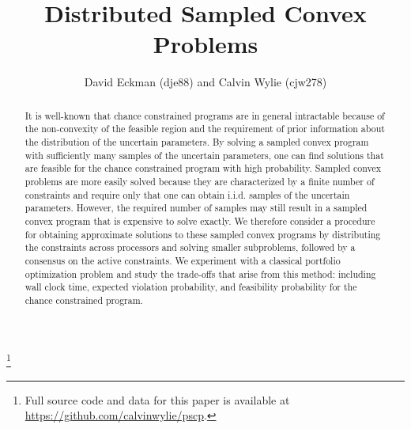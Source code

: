 \documentclass[12pt]{article}
\title{Distributed Sampled Convex Problems}
\author{David Eckman (dje88) and Calvin Wylie (cjw278)}
\date{}
\newcommand\blfootnote[1]{%
  \begingroup
  \renewcommand\thefootnote{}\footnote{#1}%
  \addtocounter{footnote}{-1}%
  \endgroup
}
\begin{document}
\setlength{\parindent}{24pt}

\maketitle

\begin{abstract}
It is well-known that chance constrained programs are in general intractable because of the non-convexity of the feasible region and the requirement of prior information about the distribution of the uncertain parameters.
By solving a sampled convex program with sufficiently many samples of the uncertain parameters, one can find solutions that are feasible for the chance constrained program with high probability.
Sampled convex problems are more easily solved because they are characterized by a finite number of constraints and require only that one can obtain i.i.d. samples of the uncertain parameters.
However, the required number of samples may still result in a sampled convex program that is expensive to solve exactly.
We therefore consider a procedure for obtaining approximate solutions to these sampled convex programs by distributing the constraints across processors and solving smaller subproblems, followed by a consensus on the active constraints.
We experiment with a classical portfolio optimization problem and study the trade-offs that arise from this method: including wall clock time, expected violation probability, and feasibility probability for the chance constrained program.
\end{abstract}

\blfootnote{Full source code and data for this paper is available at \url{https://github.com/calvinwylie/pscp}.}
\end{document}
